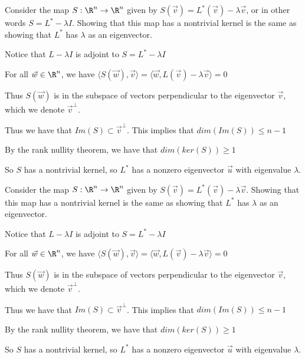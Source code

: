 \documentclass{ximera}
\begin{document}
\begin{hint}
  Consider the map $S: \R^n \to \R^n$ given by $S(\vec{v}) = L^*(\vec{v}) - \lambda \vec{v}$, or in other words $S = L^* - \lambda I$.  Showing that this map has a nontrivial kernel is the same as
  showing that $L^*$ has $\lambda$ as an eigenvector.
\end{hint}
\begin{hint}
  Notice that $L-\lambda I$ is adjoint to $S = L^* -\lambda I$
\end{hint}
\begin{hint}
  For all $\vec{w} \in \R^n$, we have $\langle S(\vec{w}),\vec{v}\rangle = \langle \vec{w}, L(\vec{v}) - \lambda \vec{v}\rangle = 0$
\end{hint}
\begin{hint}
  Thus $S(\vec{w})$ is in the subspace of vectors perpendicular to the eigenvector $\vec{v}$, which we denote $\vec{v}^\perp$.
\end{hint}
\begin{hint}
  Thus we have that $Im(S) \subset \vec{v}^\perp$.  This implies that $dim(Im(S)) \leq n-1$
\end{hint}
\begin{hint}
  By the rank nullity theorem, we have that $dim(ker(S)) \geq 1$
\end{hint}
\begin{hint}
  So $S$ has a nontrivial kernel, so $L^*$ has a nonzero eigenvector $\vec{u}$ with eigenvalue $\lambda$. 
\end{hint}
\begin{free-response}
  Consider the map $S: \R^n \to \R^n$ given by $S(\vec{v}) = L^*(\vec{v}) - \lambda \vec{v}$.  Showing that this map has a nontrivial kernel is the same as
  showing that $L^*$ has $\lambda$ as an eigenvector.
  
  Notice that $L-\lambda I$ is adjoint to $S = L^* -\lambda I$
  
  For all $\vec{w} \in \R^n$, we have $\langle S(\vec{w}),\vec{v}\rangle = \langle \vec{w}, L(\vec{v}) - \lambda \vec{v}\rangle = 0$
  
  Thus $S(\vec{w})$ is in the subspace of vectors perpendicular to the eigenvector $\vec{v}$, which we denote $\vec{v}^\perp$.
  
  Thus we have that $Im(S) \subset \vec{v}^\perp$.  This implies that $dim(Im(S)) \leq n-1$
  
  By the rank nullity theorem, we have that $dim(ker(S)) \geq 1$
  
  So $S$ has a nontrivial kernel, so $L^*$ has a nonzero eigenvector $\vec{u}$ with eigenvalue $\lambda$. 
\end{free-response}
		
		
	
\end{document}
